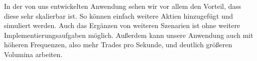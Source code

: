 In der von uns entwickelten Anwendung sehen wir vor allem den Vorteil, dass diese sehr skalierbar ist. So können einfach weitere Aktien hinzugefügt und simuliert werden. Auch das Ergänzen von weiteren Szenarien ist ohne weitere Implementierungsaufgaben möglich. Außerdem kann unsere Anwendung auch mit höheren Frequenzen, also mehr Trades pro Sekunde, und deutlich größeren Volumina arbeiten.  
